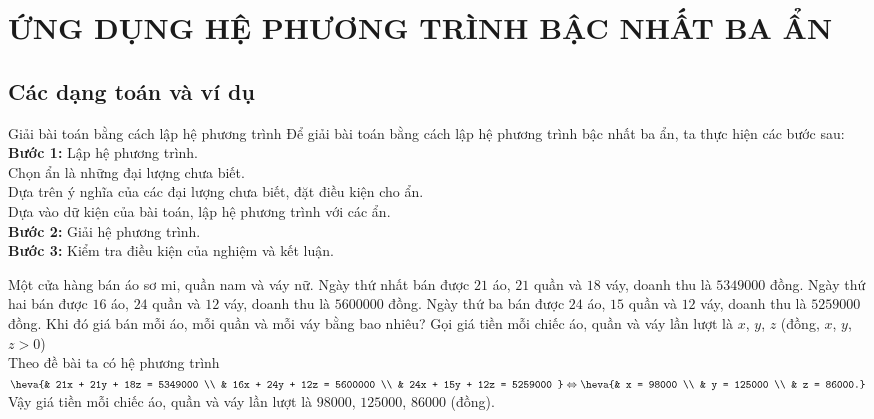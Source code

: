 \section{ỨNG DỤNG HỆ PHƯƠNG TRÌNH BẬC NHẤT BA ẨN}
\subsection{Các dạng toán và ví dụ}
\begin{dang}{Giải bài toán bằng cách lập hệ phương trình}
	Để giải bài toán bằng cách lập hệ phương trình bậc nhất ba ẩn, ta thực hiện các bước sau:\\
	\textbf{Bước 1: }Lập hệ phương trình.\\
	Chọn ẩn là những đại lượng chưa biết.\\
	Dựa trên ý nghĩa của các đại lượng chưa biết, đặt điều kiện cho ẩn.\\
	Dựa vào dữ kiện của bài toán, lập hệ phương trình với các ẩn.\\
	\textbf{Bước 2:} Giải hệ phương trình.\\
	\textbf{Bước 3: }Kiểm tra điều kiện của nghiệm và kết luận.
	\end{dang}
\begin{vd}%
	Một cửa hàng bán áo sơ mi, quần nam và váy nữ. Ngày thứ nhất bán được $21$ áo, $21$ quần và $18$ váy, doanh thu là $5349000$ đồng. Ngày thứ hai bán được $16$ áo, $24$ quần và $12$ váy, doanh thu là $5600000$ đồng. Ngày thứ ba bán được $24$ áo, $15$ quần và $12$ váy, doanh thu là $5259000$ đồng. Khi đó giá bán mỗi áo, mỗi quần và mỗi váy bằng bao nhiêu?	\loigiai
	{		Gọi giá tiền mỗi chiếc áo, quần và váy lần lượt là $x$, $y$, $z$ \big(đồng, $ x$, $y$, $z > 0$\big) \\
		Theo đề bài ta có hệ phương trình $ \heva{& 21x + 21y + 18z = 5349000 \\ & 16x + 24y + 12z = 5600000 \\ & 24x + 15y + 12z = 5259000 } \Leftrightarrow \heva{& x = 98000 \\ & y = 125000 \\ & z = 86000.} $ \\
		Vậy giá tiền mỗi chiếc áo, quần và váy lần lượt là $ 98000$, $125000$, $86000 $ \big(đồng\big).
	}
\end{vd}
